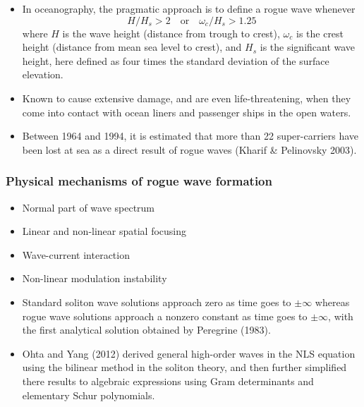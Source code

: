 \documentclass{beamer}
\def\b{\begin}
\def\e{\end}
\theoremstyle{plain}
\theoremstyle{definition}
\begin{document}
\frame
{
\b{itemize}
\item In oceanography, the pragmatic approach is to 
define a rogue wave whenever
\begin{equation*}\tag{1.1}
H/H_s>2\quad\text{or}\quad\omega_c/H_s>1.25
\e{equation*}
where $H$ is the wave height (distance from trough to crest), $\omega_c$ is the crest height (distance from mean sea level to crest), and $H_s$ is the significant wave height, here defined as four times the standard deviation of the surface elevation.  

\pause
\item Known to cause extensive damage, and are even life-threatening, when they come into contact with ocean liners and passenger ships in the open waters.  

\pause
\item Between 1964 and 1994, it is estimated that more than 22 super-carriers have been lost at sea as a direct result of rogue waves (Kharif \& Pelinovsky 2003).
\e{itemize}
}

\frame
{
\frametitle{Physical mechanisms of rogue wave formation}
\b{itemize}

\item Normal part of wave spectrum\\[25pt]

\pause
\item Linear and non-linear spatial focusing\\[25pt]

\pause
\item Wave-current interaction\\[25pt]

\pause
\item Non-linear modulation instability

\e{itemize}
}

\frame
{\b{itemize}
\item Standard soliton wave solutions approach zero as time goes to $\pm\infty$ whereas rogue wave solutions approach a nonzero constant as time goes to $\pm\infty$, with the first analytical solution obtained by Peregrine (1983). \\[10pt]

\pause
\item Ohta and Yang (2012) derived general high-order waves in the NLS equation using the bilinear method in the soliton theory, and then further simplified there results to algebraic expressions using Gram determinants and elementary Schur polynomials.  

\e{itemize}
}
\end{document}
